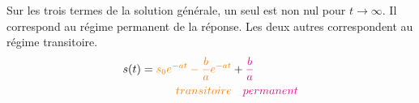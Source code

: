 Sur les trois termes de la solution générale, un seul est non
nul pour $t\to\infty$. Il correspond au régime permanent de
la réponse. Les deux autres correspondent au régime transitoire.
\begin{align*}
    s(t)=\textcolor{orange}{s_0e^{-at}-\dfrac{b}{a}e^{-at}}&+
    \textcolor{magenta}{\dfrac{b}{a}}\\
    \textcolor{orange}{transitoire} &\quad\textcolor{magenta}{permanent}
\end{align*}
